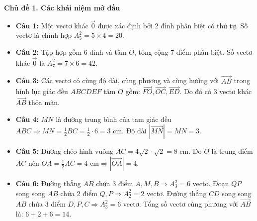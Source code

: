 \documentclass[12pt,a4paper]{article}
\begin{document}
\noindent\textbf{\large Chủ đề 1. Các khái niệm mở đầu}
\begin{itemize}[leftmargin=1.5em, itemsep=2.5pt]
    \item \textbf{Câu 1:} Một vectơ khác $\vec{0}$ được xác định bởi 2 đỉnh phân biệt có thứ tự. Số vectơ là chỉnh hợp $A_5^2 = 5 \times 4 = 20$.
    \item \textbf{Câu 2:} Tập hợp gồm 6 đỉnh và tâm $O$, tổng cộng $7$ điểm phân biệt. Số vectơ khác $\vec{0}$ là $A_7^2 = 7 \times 6 = 42$.
    \item \textbf{Câu 3:} Các vectơ có cùng độ dài, cùng phương và cùng hướng với $\vec{AB}$ trong hình lục giác đều $ABCDEF$ tâm $O$ gồm: $\vec{FO}, \vec{OC}, \vec{ED}$. Do đó có $3$ vectơ khác $\vec{AB}$ thỏa mãn.
    \item \textbf{Câu 4:} $MN$ là đường trung bình của tam giác đều $ABC \Rightarrow MN = \frac{1}{2}BC = \frac{1}{2} \cdot 6 = 3\text{ cm}$. Độ dài $|\vec{MN}| = MN = 3$.
    \item \textbf{Câu 5:} Đường chéo hình vuông $AC = 4\sqrt{2} \cdot \sqrt{2} = 8\text{ cm}$. Do $O$ là trung điểm $AC$ nên $OA = \frac{1}{2}AC = 4\text{ cm} \Rightarrow |\vec{OA}| = 4$.
    \item \textbf{Câu 6:} Đường thẳng $AB$ chứa 3 điểm $A, M, B \Rightarrow A_3^2 = 6$ vectơ. Đoạn $QP$ song song $AB$ chứa 2 điểm $Q, P \Rightarrow A_2^2 = 2$ vectơ. Đường thẳng $CD$ song song $AB$ chứa 3 điểm $D, P, C \Rightarrow A_3^2 = 6$ vectơ. Tổng số vectơ cùng phương với $\vec{AB}$ là: $6 + 2 + 6 = 14$.
\end{itemize}

\vspace{0.2cm}
\begin{center}
\end{center}
\end{document}

